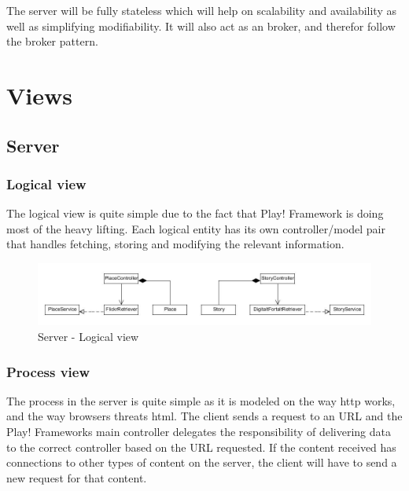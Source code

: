 \documentclass[11pt]{book}
\begin{document}
The server will be fully stateless which will help on scalability and availability as well as simplifying modifiability. It will also act as an broker, and therefor follow the broker pattern.

\section{Views}

\subsection{Server}

\subsubsection{Logical view}
The logical view is quite simple due to the fact that Play! Framework is doing most of the heavy lifting. Each logical entity has its own controller/model pair that handles fetching, storing and modifying the relevant information.

\begin{figure}[H]
      \centering
      \includegraphics[width=1.0\textwidth]{Figures/Architecture/serverLogical.jpg}
      \caption{Server - Logical view}
      \label{fig:arch_server_logical}
\end{figure}

\subsubsection{Process view}
The process in the server is quite simple as it is modeled on the way \gls{http} works, and the way browsers threats \gls{html}. The client sends a request to an URL and the Play! Frameworks main controller delegates the  responsibility of delivering data to the correct controller based on the URL requested. If the content received has connections to other types of content on the server, the client will have to send a new request for that content.
\end{document}
